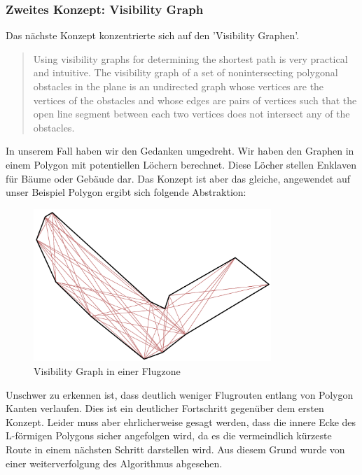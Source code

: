 \subsubsection{Zweites Konzept: Visibility Graph}
Das nächste Konzept konzentrierte sich auf den 'Visibility Graphen'. 
\cite[p.1]{IEEEPaper} 
\blockquote{Using visibility graphs for determining the shortest path is very practical and intuitive. The visibility graph of a set of nonintersecting polygonal obstacles in the plane is an undirected graph whose vertices are the vertices of the obstacles and whose edges are pairs of vertices such that the open line segment between each two vertices does not intersect any of the obstacles.}
In unserem Fall haben wir den Gedanken umgedreht. Wir haben den Graphen in einem Polygon mit potentiellen Löchern berechnet. Diese Löcher stellen Enklaven für Bäume oder Gebäude dar. Das Konzept ist aber das gleiche, angewendet auf unser Beispiel Polygon ergibt sich folgende Abstraktion:
\begin{figure}[h]
	\centering
	\includegraphics[width=0.8\textwidth]{images/routing/visibilityGraph.png}
	\caption{Visibility Graph in einer Flugzone}
	\label{fig:visibility-graph}
\end{figure}
Unschwer zu erkennen ist, dass deutlich weniger Flugrouten entlang von Polygon Kanten verlaufen. Dies ist ein deutlicher Fortschritt gegenüber dem ersten Konzept. Leider muss aber ehrlicherweise gesagt werden, dass die innere Ecke des L-förmigen Polygons sicher angefolgen wird, da es die vermeindlich kürzeste Route in einem nächsten Schritt darstellen wird. Aus diesem Grund wurde von einer weiterverfolgung des Algorithmus abgesehen.
\\
